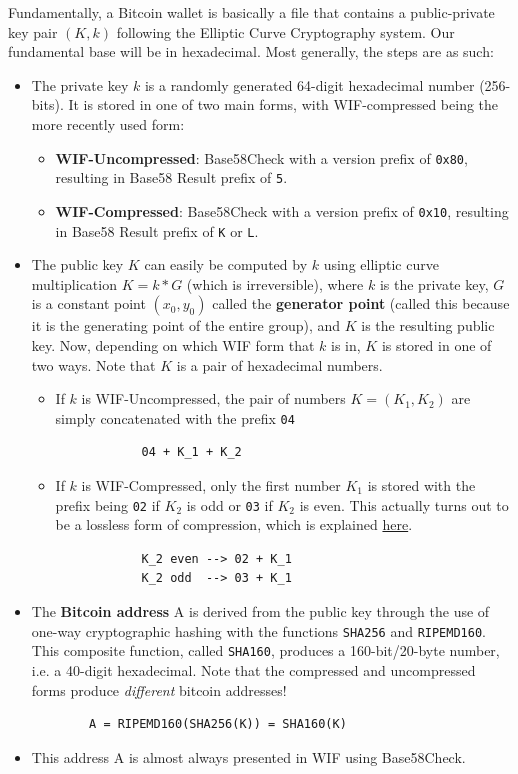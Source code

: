 \documentclass{article}
\begin{document}
  Fundamentally, a Bitcoin wallet is basically a file that contains a public-private key pair $(K, k)$ following the Elliptic Curve Cryptography system. Our fundamental base will be in hexadecimal. Most generally, the steps are as such:

  \begin{itemize}
    \item The private key $k$ is a randomly generated 64-digit hexadecimal number (256-bits). It is stored in one of two main forms, with WIF-compressed being the more recently used form:
      \begin{itemize}
        \item \textbf{WIF-Uncompressed}: Base58Check with a version prefix of \texttt{0x80}, resulting in Base58 Result prefix of \texttt{5}.
        \item \textbf{WIF-Compressed}: Base58Check with a version prefix of \texttt{0x10}, resulting in Base58 Result prefix of \texttt{K} or \texttt{L}.
      \end{itemize}
    \item The public key $K$ can easily be computed by $k$ using elliptic curve multiplication $K = k * G$ (which is irreversible), where $k$ is the private key, $G$ is a constant point $(x_0, y_0)$ called the \textbf{generator point} (called this because it is the generating point of the entire group), and $K$ is the resulting public key. Now, depending on which WIF form that $k$ is in, $K$ is stored in one of two ways. Note that $K$ is a pair of hexadecimal numbers.
      \begin{itemize}
        \item If $k$ is WIF-Uncompressed, the pair of numbers $K=(K_1,K_2)$ are simply concatenated with the prefix \texttt{04}
          \begin{lstlisting}
            04 + K_1 + K_2
          \end{lstlisting}
        \item If $k$ is WIF-Compressed, only the first number $K_1$ is stored with the prefix being \texttt{02} if $K_2$ is odd or \texttt{03} if $K_2$ is even. This actually turns out to be a lossless form of compression, which is explained \href{Public_Key_Compression.html}{here}.
          \begin{lstlisting}
            K_2 even --> 02 + K_1
            K_2 odd  --> 03 + K_1
          \end{lstlisting}
      \end{itemize}
    \item The \textbf{Bitcoin address} A is derived from the public key through the use of one-way cryptographic hashing with the functions \texttt{SHA256} and \texttt{RIPEMD160}. This composite function, called \texttt{SHA160}, produces a 160-bit/20-byte number, i.e. a 40-digit hexadecimal. Note that the compressed and uncompressed forms produce \textit{different} bitcoin addresses!
      \begin{lstlisting}
        A = RIPEMD160(SHA256(K)) = SHA160(K)
      \end{lstlisting}
    \item This address A is almost always presented in WIF using Base58Check.
  \end{itemize}
\end{document}
